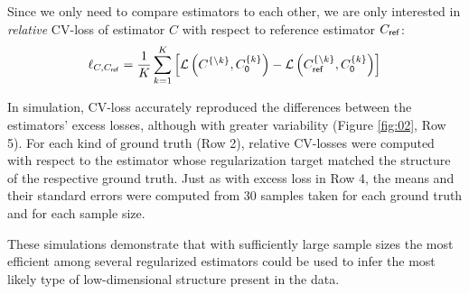 \documentclass[10pt]{article}
\newcommand{\loss}[1]{\mathcal L\left(#1\right)}
\begin{document}
Since we only need to compare estimators to each other, we are only interested in \emph{relative} CV-loss of estimator $C$ with respect to reference estimator $C_{\sf ref}$:
\begin{equation}\label{eq:rel-cv-loss}
    \ell_{C,C_{\sf ref}} = \frac 1 K \sum\limits_{k=1}^K \left[
        \loss{C^{\{\setminus k\}},C_{\sf 0}^{\{k\}}} -
    \loss{C_{\sf ref}^{\{\setminus k\}},C_{\sf 0}^{\{k\}}} 
\right]
\end{equation}

In simulation, CV-loss accurately reproduced the differences between the estimators' excess losses, although with greater variability (Figure \ref{fig:02}, Row 5). For each kind of ground truth (Row 2), relative CV-losses were computed with respect to the estimator whose regularization target matched the structure of the respective ground truth. Just as with excess loss in Row 4, the means and their standard errors were computed from 30 samples taken for each ground truth and for each sample size.

These simulations demonstrate that with sufficiently large sample sizes the most efficient among several regularized estimators could be used to infer the most likely type of low-dimensional structure present in the data.
\end{document}
